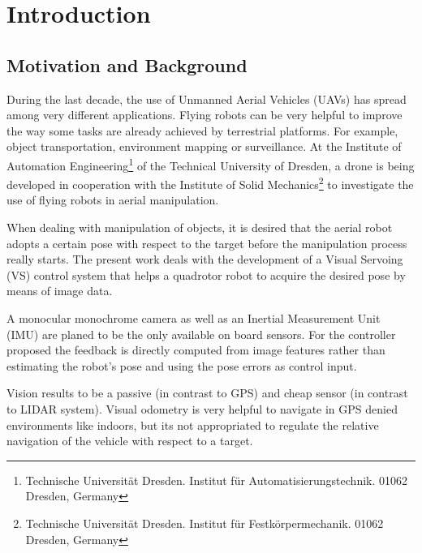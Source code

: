 
\chapter{Introduction}
\label{chap:introduction}

\section{Motivation and Background}
\label{sec:motivation-brackground}

During the last decade, the use of Unmanned Aerial Vehicles (UAVs) has spread among very different applications. Flying robots can be very helpful to improve the way some tasks are already achieved by terrestrial platforms. For example, object transportation, environment mapping or surveillance. At the Institute of Automation Engineering\footnote{Technische Universität Dresden. Institut für Automatisierungstechnik. 01062 Dresden, Germany} of the Technical University of Dresden, a drone is being developed in cooperation with the Institute of Solid Mechanics\footnote{Technische Universität Dresden. Institut für Festkörpermechanik. 01062 Dresden, Germany} to investigate the use of flying robots in aerial manipulation.


When dealing with manipulation of objects, it is desired that the aerial robot adopts a certain pose with respect to the target before the manipulation process really starts. The present work deals with the development of a Visual Servoing (VS) control system that helps a quadrotor robot to acquire the desired pose by means of image data.


A monocular monochrome camera as well as an Inertial Measurement Unit (IMU) are planed to be the only available on board sensors. For the controller proposed the feedback is directly computed from image features rather than estimating the robot’s pose and using the pose errors as control input.


Vision results to be a passive (in contrast to GPS) and cheap sensor (in contrast to LIDAR system). Visual odometry is very helpful to navigate in GPS denied environments like indoors, but its not appropriated to regulate the relative navigation of the vehicle with respect to a target.  

